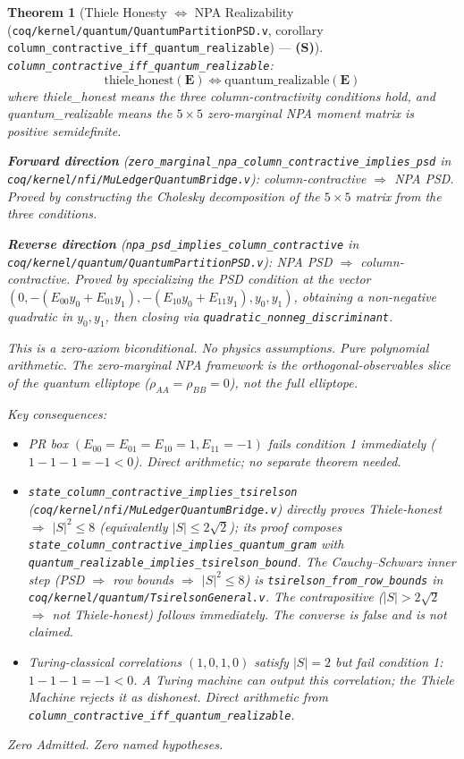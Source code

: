 \documentclass[11pt, a4paper]{report}
\theoremstyle{definition}
\theoremstyle{plain}
\newtheorem{theorem}{Theorem}[chapter]
\begin{document}
\begin{theorem}[Thiele Honesty $\iff$ NPA Realizability {\normalfont (\texttt{coq/kernel/quantum/QuantumPartitionPSD.v}, corollary \texttt{column\_contractive\_iff\_quantum\_realizable})} --- \textbf{(S)}]
\label{thm:thiele_honest_iff_qr}
\texttt{column\_contractive\_iff\_quantum\_realizable}:
\[
\text{thiele\_honest}(\mathbf{E}) \iff \text{quantum\_realizable}(\mathbf{E})
\]
where \emph{thiele\_honest} means the three column-contractivity conditions hold, and \emph{quantum\_realizable} means the $5\times5$ zero-marginal NPA moment matrix is positive semidefinite.

\textbf{Forward direction} (\texttt{zero\_marginal\_npa\_column\_contractive\_implies\_psd} in \texttt{coq/kernel/nfi/MuLedgerQuantumBridge.v}): column-contractive $\Rightarrow$ NPA PSD. Proved by constructing the Cholesky decomposition of the $5\times5$ matrix from the three conditions.

\textbf{Reverse direction} (\texttt{npa\_psd\_implies\_column\_contractive} in \texttt{coq/kernel/quantum/QuantumPartitionPSD.v}): NPA PSD $\Rightarrow$ column-contractive. Proved by specializing the PSD condition at the vector $(0, -(E_{00}y_0+E_{01}y_1), -(E_{10}y_0+E_{11}y_1), y_0, y_1)$, obtaining a non-negative quadratic in $y_0, y_1$, then closing via \texttt{quadratic\_nonneg\_discriminant}.

This is a zero-axiom biconditional. No physics assumptions. Pure polynomial arithmetic. The zero-marginal NPA framework is the orthogonal-observables slice of the quantum elliptope ($\rho_{AA}=\rho_{BB}=0$), not the full elliptope.

Key consequences:
\begin{itemize}
\item PR box $(E_{00}=E_{01}=E_{10}=1, E_{11}=-1)$ fails condition 1 immediately ($1-1-1=-1<0$). Direct arithmetic; no separate theorem needed.
\item \texttt{state\_column\_contractive\_implies\_tsirelson} (\texttt{coq/kernel/nfi/MuLedgerQuantumBridge.v}) directly proves Thiele-honest $\Rightarrow$ $|S|^2 \leq 8$ (equivalently $|S| \leq 2\sqrt{2}$); its proof composes \texttt{state\_column\_contractive\_implies\_quantum\_gram} with \texttt{quantum\_realizable\_implies\_tsirelson\_bound}. The Cauchy--Schwarz inner step (PSD $\Rightarrow$ row bounds $\Rightarrow$ $|S|^2 \leq 8$) is \texttt{tsirelson\_from\_row\_bounds} in \texttt{coq/kernel/quantum/TsirelsonGeneral.v}. The contrapositive ($|S| > 2\sqrt{2}$ $\Rightarrow$ not Thiele-honest) follows immediately. The converse is false and is not claimed.
\item Turing-classical correlations $(1,0,1,0)$ satisfy $|S|=2$ but fail condition 1: $1-1-1=-1<0$. A Turing machine can output this correlation; the Thiele Machine rejects it as dishonest. Direct arithmetic from \texttt{column\_contractive\_iff\_quantum\_realizable}.
\end{itemize}
Zero Admitted. Zero named hypotheses.
\end{theorem}
\end{document}
